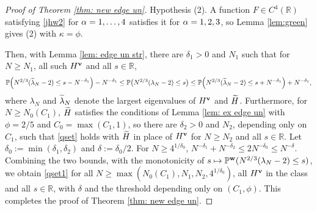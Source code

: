 \begin{proof}[Proof of Theorem \ref{thm: new edge un}]
Hypothesis (2). A function $F\in C^4(\mathbb R)$ satisfying \eqref{jhw2} for $\alpha=1,\dots,4$ satisfies it for $\alpha=1,2,3$, so Lemma \ref{lem:green} gives (2) with $\kappa=\phi$.

Then, with Lemma \ref{lem: edge un str}, there are $\delta_1>0$ and $N_1$ such that for $N\ge N_1$, all such $H^{\mathbf{v}}$ and all $s\in\mathbb R$,
\begin{equation}
\mathbb{P} \Big( N^{2/3} (\widetilde\lambda_N -2) \leq s - N^{-\delta_1} \Big) - N^{-\delta_1}
\leq \mathbb{P} \big( N^{2/3} (\lambda_N -2) \leq s \big)
\leq \mathbb{P} \Big( N^{2/3} (\widetilde\lambda_N -2) \leq s + N^{-\delta_1} \Big) + N^{-\delta_1},
\end{equation}
where $\lambda_N$ and $\widetilde\lambda_N$ denote the largest eigenvalues of $H^{\mathbf{v}}$ and $\widetilde H$. Furthermore, for $N\ge N_0(C_1)$, $\widetilde H$ satisfies the conditions of Lemma \ref{lem: ex edge un} with $\phi=2/5$ and $C_0=\max(C_1,1)$, so there are $\delta_2>0$ and $N_2$, depending only on $C_1$, such that \eqref{qset} holds with $\widetilde H$ in place of $H^{\mathbf{v}}$ for $N\ge N_2$ and all $s\in\mathbb R$. Let $\delta_0:=\min(\delta_1,\delta_2)$ and $\delta:=\delta_0/2$. For $N\ge4^{1/\delta_0}$, $N^{-\delta_1}+N^{-\delta_2}\le2N^{-\delta_0}\le N^{-\delta}$. Combining the two bounds, with the monotonicity of $s\mapsto\mathbb{P}^{\mathbf{w}}(N^{2/3}(\lambda_N-2)\le s)$, we obtain \eqref{qset1} for all $N\ge\max(N_0(C_1),N_1,N_2,4^{1/\delta_0})$, all $H^{\mathbf{v}}$ in the class and all $s\in\mathbb R$, with $\delta$ and the threshold depending only on $(C_1,\phi)$. This completes the proof of Theorem \ref{thm: new edge un}.
\end{proof}


